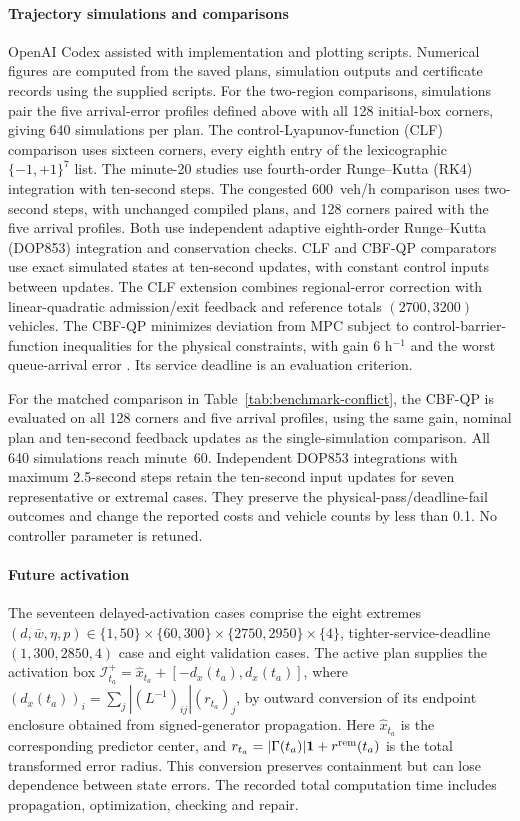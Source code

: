 \documentclass[final]{cas-sc}
\theoremstyle{definition}
\theoremstyle{plain}
\theoremstyle{definition}
\theoremstyle{plain}
\begin{document}
\paragraph{Trajectory simulations and comparisons}
OpenAI Codex assisted with implementation and plotting scripts.
Numerical figures are computed from the saved plans, simulation
outputs and certificate records using the supplied scripts.
For the two-region comparisons, simulations pair the five arrival-error
profiles defined above with all 128 initial-box corners, giving 640
simulations per plan. The control-Lyapunov-function (CLF) comparison
uses sixteen corners,
every eighth entry of the lexicographic $\{-1,+1\}^7$ list.
The minute-20 studies use fourth-order Runge--Kutta
(RK4) integration with ten-second steps. The congested 600~veh/h
comparison uses two-second steps, with unchanged compiled plans,
and 128 corners paired with the five arrival profiles. Both use independent
adaptive eighth-order Runge--Kutta (DOP853) integration and conservation
checks. CLF and CBF-QP comparators use exact simulated states at ten-second
updates, with constant control inputs between updates.
The CLF extension combines regional-error correction with
linear-quadratic admission/exit feedback and reference totals
$(2700,3200)$ vehicles. The CBF-QP minimizes deviation from
MPC subject to control-barrier-function inequalities for the physical constraints, with gain $6$ h$^{-1}$
and the worst queue-arrival error \cite{ames2017}. Its service deadline
is an evaluation criterion. 

For the matched comparison in Table~\ref{tab:benchmark-conflict},
the CBF-QP is evaluated on all 128 corners and five arrival profiles,
using the same gain, nominal plan and ten-second feedback updates as
the single-simulation comparison. All 640 simulations reach minute~60. Independent DOP853 integrations with maximum 2.5-second
steps retain the ten-second input updates for seven representative
or extremal cases. They preserve the physical-pass/deadline-fail
outcomes and change the reported costs and vehicle counts by less
than 0.1. No controller parameter is retuned.

\paragraph{Future activation}
\label{supp:detail:sec:delayed-handover-results}
\label{app:sequential-handover}
The seventeen delayed-activation cases comprise the eight extremes
$(d,\bar w,\eta,p)\in\{1,50\}\times\{60,300\}\times
\{2750,2950\}\times\{4\}$, tighter-service-deadline $(1,300,2850,4)$ case and eight
validation cases. The active plan supplies the activation box
$\mathcal I_{t_a}^+=\widehat x_{t_a}+[-d_x(t_a),d_x(t_a)]$, where
$(d_x(t_a))_i=\sum_j|(L^{-1})_{ij}|(r_{t_a})_j$, by outward conversion of its
endpoint enclosure obtained from signed-generator propagation. Here
$\widehat x_{t_a}$ is the corresponding predictor center, and
$r_{t_a}=|\Gamma(t_a)|\mathbf1+r^{\rm rem}(t_a)$ is the total
transformed error radius. This conversion preserves containment but can
lose dependence between state errors.
The recorded total computation time includes propagation,
optimization, checking and repair.
\end{document}
